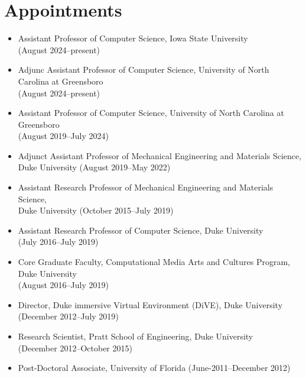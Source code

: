 \documentclass[wideaddress]{vitae}
\author{Regis Kopper}
\begin{document}
\maketitle


\section{Appointments}
\begin{itemize}
	\item{Assistant Professor of Computer Science, Iowa State University\\(August 2024--present)}
	\item{Adjunc Assistant Professor of Computer Science, University of North Carolina at Greensboro\\(August 2024--present)}
    \item{Assistant Professor of Computer Science, University of North Carolina at Greensboro\\(August 2019--July 2024)}
	\item{Adjunct Assistant Professor of Mechanical Engineering and Materials Science,\\Duke University (August 2019--May 2022)}
	\item{Assistant Research Professor of Mechanical Engineering and Materials Science,\\Duke University (October 2015--July 2019)}
	\item{Assistant Research Professor of Computer Science, Duke University\\(July 2016--July 2019)}
	\item{Core Graduate Faculty, Computational Media Arts and Cultures Program, Duke University\\(August 2016--July 2019)}
	\item{Director, Duke immersive Virtual Environment (DiVE), Duke University\\(December 2012--July 2019)}
	\item{Research Scientist, Pratt School of Engineering, Duke University\\(December 2012--October 2015)}
	\item{Post-Doctoral Associate, University of Florida (June-2011--December 2012)}
\end{itemize}
\end{document}
